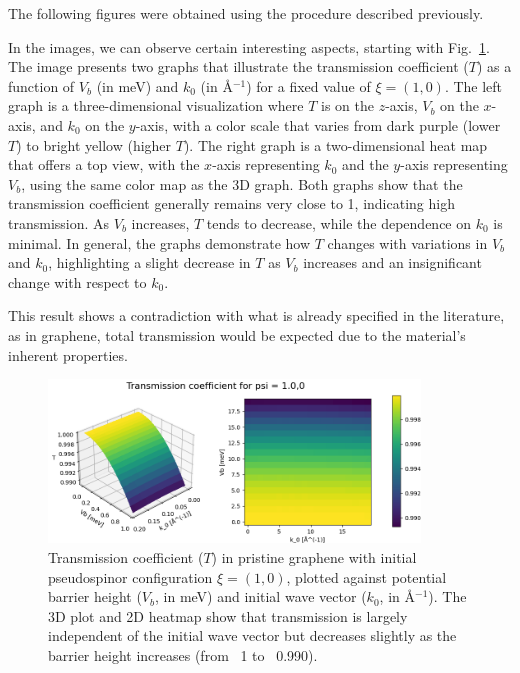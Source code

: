 The following figures were obtained using the procedure described previously.

In the images, we can observe certain interesting aspects, starting with Fig.~\ref{fig:noRashba}.
The image presents two graphs that illustrate the transmission coefficient ($T$) as a function of $V_b$ (in meV) and $k_0$ (in \AA$^{-1}$) for a fixed value of $\xi = (1, 0)$.
The left graph is a three-dimensional visualization where $T$ is on the $z$-axis, $V_b$ on the $x$-axis, and $k_0$ on the $y$-axis, with a color scale that varies from dark purple (lower $T$) to bright yellow (higher $T$).
The right graph is a two-dimensional heat map that offers a top view, with the $x$-axis representing $k_0$ and the $y$-axis representing $V_b$, using the same color map as the 3D graph.
Both graphs show that the transmission coefficient generally remains very close to 1, indicating high transmission.
As $V_b$ increases, $T$ tends to decrease, while the dependence on $k_0$ is minimal.
In general, the graphs demonstrate how $T$ changes with variations in $V_b$ and $k_0$, highlighting a slight decrease in $T$ as $V_b$ increases and an insignificant change with respect to $k_0$.

This result shows a contradiction with what is already specified in the literature, as in graphene, total transmission would be expected due to the material's inherent properties\cite{horsell2008, Young2009}.

\begin{figure}%
    \centering
        \includegraphics[width=0.88\textwidth]
        {../assets/images/No-Rashba/TCoefficient(1.0,0)xalpha=0beta=0}
        \caption{Transmission coefficient ($T$) in pristine graphene with initial pseudospinor configuration $\xi = (1, 0)$, plotted against potential barrier height ($V_b$, in meV) and initial wave vector ($k_0$, in \AA$^{-1}$). The 3D plot and 2D heatmap show that transmission is largely independent of the initial wave vector but decreases slightly as the barrier height increases (from ~1 to ~0.990).}
        \label{fig:noRashba}
    \end{figure}

